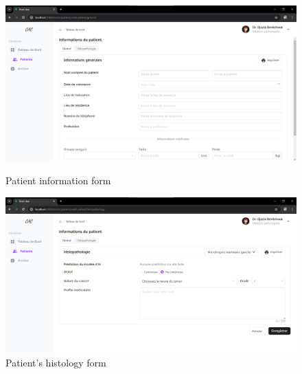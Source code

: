 \documentclass[
11pt, %
english, %
singlespacing, %
headsepline, %
]{project_structure}
\begin{document}
\begin{figure}[H]
    \centering
    \begin{minipage}{0.49\textwidth}
        \centering
        \includegraphics[width=1\linewidth]{figures/SI/web/patient info.png}
        \caption{Patient information form}
        \label{fig:patient_info}
    \end{minipage}
    \hfill
    \begin{minipage}{0.49\textwidth}
        \centering
        \includegraphics[width=1\linewidth]{figures/SI/web/histo.png}
        \caption{Patient's histology form}
        \label{fig:histo}
    \end{minipage}
\end{figure}
\end{document}
